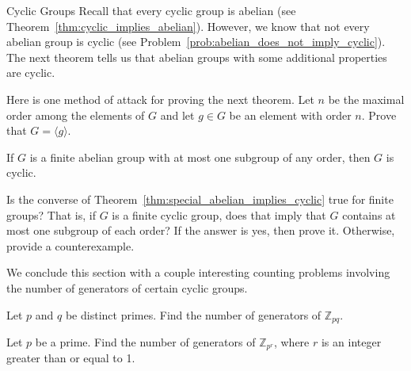 \begin{section}{Cyclic Groups}
Recall that every cyclic group is abelian (see Theorem~\ref{thm:cyclic_implies_abelian}).  However, we know that not every abelian group is cyclic (see Problem~\ref{prob:abelian_does_not_imply_cyclic}).  The next theorem tells us that abelian groups with some additional properties are cyclic.


Here is one method of attack for proving the next theorem. Let $n$ be the maximal order among the elements of $G$ and let $g\in G$ be an element with order $n$. Prove that $G=\langle g\rangle$.

\begin{theorem}\label{thm:special_abelian_implies_cyclic}
If $G$ is a finite abelian group with at most one subgroup of any order, then $G$ is cyclic.
\end{theorem}

\begin{problem}
Is the converse of Theorem~\ref{thm:special_abelian_implies_cyclic} true for finite groups?  That is, if $G$ is a finite cyclic group, does that imply that $G$ contains at most one subgroup of each order? If the answer is yes, then prove it.  Otherwise, provide a counterexample.
\end{problem}

We conclude this section with a couple interesting counting problems involving the number of generators of certain cyclic groups.

\begin{problem}
Let $p$ and $q$ be distinct primes. Find the number of generators of $\mathbb{Z}_{pq}$.
\end{problem}

\begin{problem}
Let $p$ be a prime. Find the number of generators of $\mathbb{Z}_{p^r}$, where $r$ is an integer greater than or equal to 1.
\end{problem}

\end{section}

